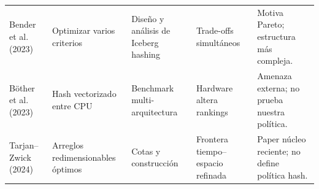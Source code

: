 \begin{longtable}{p{2.5cm}p{3cm}p{3cm}p{3.4cm}p{2.8cm}}
Bender et al. (2023) & Optimizar varios criterios & Diseño y análisis de Iceberg hashing & Trade-offs simultáneos & Motiva Pareto; estructura más compleja.\\
Böther et al. (2023) & Hash vectorizado entre CPU & Benchmark multi-arquitectura & Hardware altera rankings & Amenaza externa; no prueba nuestra política.\\
Tarjan--Zwick (2024) & Arreglos redimensionables óptimos & Cotas y construcción & Frontera tiempo--espacio refinada & Paper núcleo reciente; no define política hash.\\
\bottomrule
\end{longtable}
\normalsize

